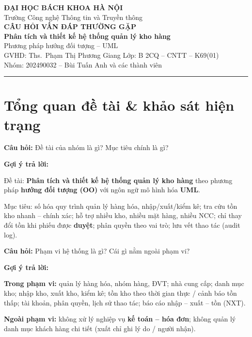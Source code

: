 \documentclass[12pt,a4paper]{article}
\newcommand{\cau}[1]{\textbf{\textcolor{qblue}{Câu hỏi:}} #1}
\newcommand{\traloi}{\par\smallskip\textbf{\textcolor{qblue!70!black}{Gợi ý trả lời:}}\par}
\begin{document}
\begin{center}
  {\large\bfseries ĐẠI HỌC BÁCH KHOA HÀ NỘI}\\[2pt]
  {\normalsize Trường Công nghệ Thông tin và Truyền thông}\\[10pt]
  {\LARGE\bfseries\color{qblue} CÂU HỎI VẤN ĐÁP THƯỜNG GẶP}\\[4pt]
  {\Large\bfseries Phân tích và thiết kế hệ thống quản lý kho hàng}\\[8pt]
  {\normalsize Phương pháp hướng đối tượng -- UML}\\[6pt]
  {\small GVHD: Ths.\ Phạm Thị Phương Giang \quad Lớp: B 2CQ -- CNTT -- K69(01)}\\[2pt]
  {\small Nhóm: 202490032 -- Bùi Tuấn Anh và các thành viên}
\end{center}

\vspace{4pt}
\noindent\rule{\textwidth}{0.8pt}

\tableofcontents
\newpage

\section{Tổng quan đề tài \& khảo sát hiện trạng}

\begin{cauhoi}[Câu 1]
\cau{Đề tài của nhóm là gì? Mục tiêu chính là gì?}
\traloi
Đề tài: \textbf{Phân tích và thiết kế hệ thống quản lý kho hàng} theo phương pháp \textbf{hướng đối tượng (OO)} với ngôn ngữ mô hình hóa \textbf{UML}.

Mục tiêu: số hóa quy trình quản lý hàng hóa, nhập/xuất/kiểm kê; tra cứu tồn kho nhanh -- chính xác; hỗ trợ nhiều kho, nhiều mặt hàng, nhiều NCC; chỉ thay đổi tồn khi phiếu được \textbf{duyệt}; phân quyền theo vai trò; lưu vết thao tác (audit log).
\end{cauhoi}

\begin{cauhoi}[Câu 2]
\cau{Phạm vi hệ thống là gì? Cái gì nằm ngoài phạm vi?}
\traloi
\textbf{Trong phạm vi:} quản lý hàng hóa, nhóm hàng, ĐVT; nhà cung cấp; danh mục kho; nhập kho, xuất kho, kiểm kê; tồn kho theo thời gian thực / cảnh báo tồn thấp; tài khoản, phân quyền, lịch sử thao tác; báo cáo nhập -- xuất -- tồn (NXT).

\textbf{Ngoài phạm vi:} không xử lý nghiệp vụ \textbf{kế toán -- hóa đơn}; không quản lý danh mục khách hàng chi tiết (xuất chỉ ghi lý do / người nhận).
\end{cauhoi}
\end{document}

